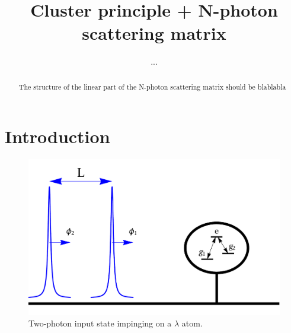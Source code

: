 \documentclass[aps,pra,reprint,amsmath,amssymb]{revtex4-1}
\begin{document}
\title{Cluster principle + N-photon scattering matrix}

\author{...}


\begin{abstract}
The structure of the linear part of the N-photon scattering matrix should be blablabla
\end{abstract}



\maketitle


\section{Introduction}

\cite{fan10,Xu2015,Xu2016,Sanchez-Burillo2015,Sanchez-Burillo2016}

\begin{figure}
\includegraphics[scale=0.25]{input.pdf}
\caption{Two-photon input state impinging on a $\lambda$ atom.}
\end{figure}



\end{document}
